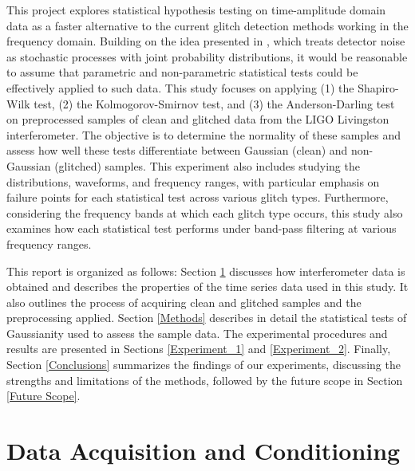 \documentclass[12pt]{article}
\begin{document}
\medskip
\noindent This project explores statistical hypothesis testing on time-amplitude domain data as a faster alternative to the current glitch detection methods working in the frequency domain. Building on the idea presented in \cite{collaboration_guide_2020}, which treats detector noise as stochastic processes with joint probability distributions, it would be reasonable to assume that parametric and non-parametric statistical tests could be effectively applied to such data. This study focuses on applying (1) the Shapiro-Wilk test, (2) the Kolmogorov-Smirnov test, and (3) the Anderson-Darling test on preprocessed samples of clean and glitched data from the LIGO Livingston interferometer. The objective is to determine the normality of these samples and assess how well these tests differentiate between Gaussian (clean) and non-Gaussian (glitched) samples. This experiment also includes studying the distributions, waveforms, and frequency ranges, with particular emphasis on failure points for each statistical test across various glitch types. Furthermore, considering the frequency bands at which each glitch type occurs, this study also examines how each statistical test performs under band-pass filtering at various frequency ranges.

\medskip
\noindent This report is organized as follows: Section \ref{Data} discusses how interferometer data is obtained and describes the properties of the time series data used in this study. It also outlines the process of acquiring clean and glitched samples and the preprocessing applied. Section \ref{Methods} describes in detail the statistical tests of Gaussianity used to assess the sample data. The experimental procedures and results are presented in Sections \ref{Experiment_1} and \ref{Experiment_2}. Finally, Section \ref{Conclusions} summarizes the findings of our experiments, discussing the strengths and limitations of the methods, followed by the future scope in Section \ref{Future Scope}.

\pagebreak

\section{Data Acquisition and Conditioning}\label{Data}
\end{document}

